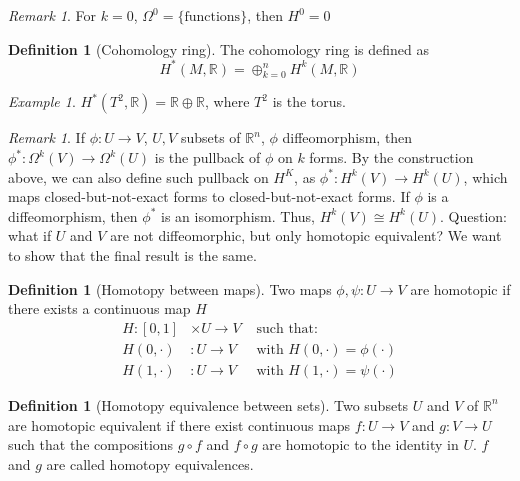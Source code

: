 \documentclass[a4paper,11pt,titlepage]{article}
\numberwithin{equation}{section}
\theoremstyle{definition}
\newtheorem{definition}[theorem]{Definition}
\theoremstyle{remark}
\newtheorem{remark}[theorem]{Remark}
\newtheorem{example}[theorem]{Example}
\newcommand{\rfield}{\mathbb{R}}
\begin{document}
\begin{remark}
  For $k=0$, $\Omega^0 = \{\text{functions}\}$, then $H^0 = 0$
\end{remark}

\begin{definition}[Cohomology ring]
  The cohomology ring is defined as
  $$H^*(M, \rfield) = \oplus_{k=0}^n H^k(M, \rfield)$$
\end{definition}

\begin{example}
  $H^*(T^2, \rfield) = \rfield \oplus \rfield$, where $T^2$ is the torus.
\end{example}

\begin{remark}
  If $\phi \colon U \rightarrow V$, $U, V$ subsets of $\rfield^n$, $\phi$ diffeomorphism, then $\phi^* \colon \Omega^k(V) \rightarrow \Omega^k(U)$ is the pullback of $\phi$ on $k$ forms. By the construction above, we can also define such pullback on $H^K$, as $\phi^* \colon H^k(V) \rightarrow H^k(U)$, which maps closed-but-not-exact forms to closed-but-not-exact forms.
  If $\phi$ is a diffeomorphism, then $\phi^*$ is an isomorphism. Thus, $H^k(V) \cong H^k(U)$.
  Question: what if $U$ and $V$ are not diffeomorphic, but only homotopic equivalent? We want to show that the final result is the same.
 \end{remark}

\begin{definition}[Homotopy between maps]
  Two maps $\phi, \psi \colon U \rightarrow V$ are homotopic if there exists a continuous map $H$
  \begin{align*}
    H \colon [0,1] &\times U \rightarrow V &\text{ such that:}\\
    H(0, \cdot) &\colon U \rightarrow V &\text{ with } H(0, \cdot) = \phi(\cdot) \\
    H(1, \cdot) &\colon U \rightarrow V &\text{ with } H(1, \cdot) = \psi(\cdot)
  \end{align*}
\end{definition}

 \begin{definition}[Homotopy equivalence between sets]
   Two subsets $U$ and $V$ of $\rfield^n$ are homotopic equivalent if there exist continuous maps $f \colon U \rightarrow V$ and $g \colon V \rightarrow U$ such that the compositions $g \circ f$ and $f \circ g$ are homotopic to the identity in $U$. $f$ and $g$ are called homotopy equivalences.
 \end{definition}
\end{document}
